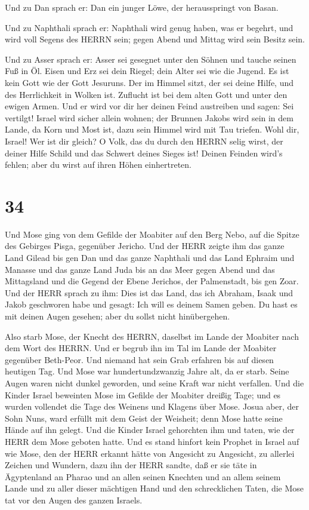  Und zu Dan sprach er: Dan ein junger Löwe, der
herausspringt von Basan.

 Und zu Naphthali sprach er: Naphthali wird genug haben,
was er begehrt, und wird voll Segens des HERRN sein; gegen Abend und
Mittag wird sein Besitz sein.

 Und zu Asser sprach er: Asser sei gesegnet unter den
Söhnen und tauche seinen Fuß in Öl.  Eisen und Erz sei dein
Riegel; dein Alter sei wie die Jugend.  Es ist kein Gott
wie der Gott Jesuruns. Der im Himmel sitzt, der sei deine Hilfe, und des
Herrlichkeit in Wolken ist.  Zuflucht ist bei dem alten
Gott und unter den ewigen Armen. Und er wird vor dir her deinen Feind
austreiben und sagen: Sei vertilgt!  Israel wird sicher
allein wohnen; der Brunnen Jakobs wird sein in dem Lande, da Korn und
Most ist, dazu sein Himmel wird mit Tau triefen.  Wohl dir,
Israel! Wer ist dir gleich? O Volk, das du durch den HERRN selig wirst,
der deiner Hilfe Schild und das Schwert deines Sieges ist! Deinen
Feinden wird's fehlen; aber du wirst auf ihren Höhen einhertreten.

\hypertarget{section-33}{%
\section{34}\label{section-33}}

 Und Mose ging von dem Gefilde der Moabiter auf den Berg
Nebo, auf die Spitze des Gebirges Pisga, gegenüber Jericho. Und der HERR
zeigte ihm das ganze Land Gilead bis gen Dan  und das ganze
Naphthali und das Land Ephraim und Manasse und das ganze Land Juda bis
an das Meer gegen Abend  und das Mittagsland und die Gegend
der Ebene Jerichos, der Palmenstadt, bis gen Zoar.  Und der
HERR sprach zu ihm: Dies ist das Land, das ich Abraham, Isaak und Jakob
geschworen habe und gesagt: Ich will es deinem Samen geben. Du hast es
mit deinen Augen gesehen; aber du sollst nicht hinübergehen.

 Also starb Mose, der Knecht des HERRN, daselbst im Lande
der Moabiter nach dem Wort des HERRN.  Und er begrub ihn im
Tal im Lande der Moabiter gegenüber Beth-Peor. Und niemand hat sein Grab
erfahren bis auf diesen heutigen Tag.  Und Mose war
hundertundzwanzig Jahre alt, da er starb. Seine Augen waren nicht dunkel
geworden, und seine Kraft war nicht verfallen.  Und die
Kinder Israel beweinten Mose im Gefilde der Moabiter dreißig Tage; und
es wurden vollendet die Tage des Weinens und Klagens über Mose.
 Josua aber, der Sohn Nuns, ward erfüllt mit dem Geist der
Weisheit; denn Mose hatte seine Hände auf ihn gelegt. Und die Kinder
Israel gehorchten ihm und taten, wie der HERR dem Mose geboten hatte.
 Und es stand hinfort kein Prophet in Israel auf wie Mose,
den der HERR erkannt hätte von Angesicht zu Angesicht,  zu
allerlei Zeichen und Wundern, dazu ihn der HERR sandte, daß er sie täte
in Ägyptenland an Pharao und an allen seinen Knechten und an allem
seinem Lande  und zu aller dieser mächtigen Hand und den
schrecklichen Taten, die Mose tat vor den Augen des ganzen Israels.

